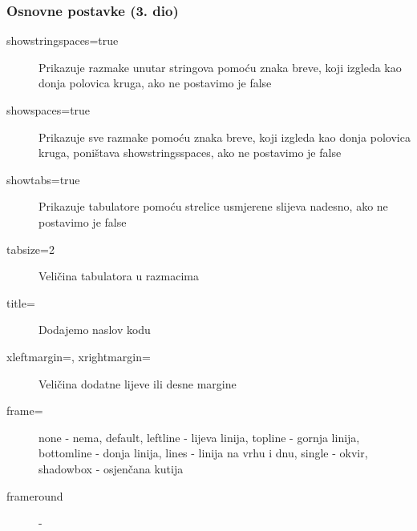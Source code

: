 \documentclass{beamer}
\begin{document}
		\begin{frame}[fragile]
		\frametitle{Osnovne postavke (3. dio)}
		\begin{description}
			\item[showstringspaces=true] Prikazuje razmake unutar stringova pomoću znaka breve, koji izgleda kao donja polovica kruga, ako ne postavimo je false
			\item[showspaces=true] Prikazuje sve razmake pomoću znaka breve, koji izgleda kao donja polovica kruga, poništava showstringsspaces, ako ne postavimo je false
			\item[showtabs=true] Prikazuje tabulatore pomoću strelice usmjerene slijeva nadesno, ako ne postavimo je false
			\item[tabsize=2] Veličina tabulatora u razmacima
			\item[title=] Dodajemo naslov kodu
			\item[xleftmargin=, xrightmargin=] Veličina dodatne lijeve ili desne margine
			\item[frame=] none - nema, default, leftline - lijeva linija, topline - gornja linija, bottomline - donja linija, lines - linija na vrhu i dnu, single - okvir, shadowbox - osjenčana kutija
			
			\item[frameround] -  

			\end{description}
	\end{frame}
\end{document}
